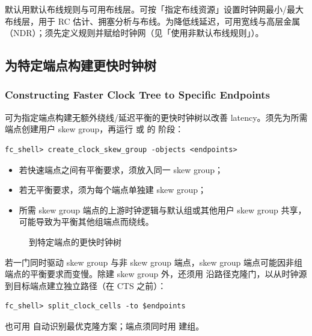 默认用默认布线规则与可用布线层。可按「指定布线资源」设置时钟网最小/最大布线层，用于 RC 估计、拥塞分析与布线。为降低线延迟，可用宽线与高层金属（NDR）；须先定义规则并赋给时钟网（见「使用非默认布线规则」）。

\subsection{为特定端点构建更快时钟树}
\subsubsection*{Constructing Faster Clock Tree to Specific Endpoints}

可为指定端点构建无额外绕线/延迟平衡的更快时钟树以改善 latency。须先为所需端点创建用户 skew group，再运行  或  的  阶段：
\begin{lstlisting}
fc_shell> create_clock_skew_group -objects <endpoints>
\end{lstlisting}
\begin{noteBox}
\begin{itemize}
  \item 若快速端点之间有平衡要求，须放入同一 skew group；
  \item 若无平衡要求，须为每个端点单独建 skew group；
  \item 所需 skew group 端点的上游时钟逻辑与默认组或其他用户 skew group 共享，可能导致为平衡其他组端点而绕线。
\end{itemize}
\end{noteBox}

\begin{figure}[htbp]
\centering
{}
\caption{到特定端点的更快时钟树}
\label{fig:cts-faster}
\end{figure}

若一门同时驱动 skew group 与非 skew group 端点，skew group 端点可能因非组端点的平衡要求而变慢。除建 skew group 外，还须用  沿路径克隆门，以从时钟源到目标端点建立独立路径（在 CTS 之前）：
\begin{lstlisting}
fc_shell> split_clock_cells -to $endpoints
\end{lstlisting}
也可用  自动识别最优克隆方案；端点须同时用  建组。


